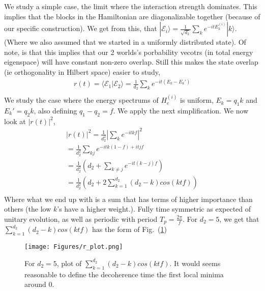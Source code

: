 \documentclass{article}
\begin{document}
We study a simple case, the limit where the interaction strength dominates. This implies that the blocks in the Hamiltonian are diagonalizable together (because of our specific construction). We get from this, that $|\mathcal{E}_i\rangle=\frac{1}{\sqrt{d_2}}\sum_ke^{-itE^{(i)}_k}|k\rangle$. (Where we also assumed that we started in a uniformly distributed state). Of note, is that this implies that our 2 worlds's porbability vecotrs (in total energy eigenspace) will have constant non-zero overlap. Still this makes the state overlap (ie orthogonality in Hilbert space) easier to study,
\begin{align}
    r(t)=\langle\mathcal{E}_1|\mathcal{E}_2\rangle = \frac{1}{d_2}\sum_ke^{-it(E_k-E_k')}\\
\end{align}
We study the case where the energy spectrums of $H_e^{(i)}$ is uniform, $E_k=q_1k$ and $E_k'=q_2k$, also defining $q_1-q_2=f$. We apply the next simplification. We now look at $|r(t)|^2$,
\begin{align}
    |r(t)|^2=\frac{1}{d_2^2}|\sum_ke^{-itkf}|^2\\
    =\frac{1}{d_2^2}\sum_{kj}e^{-itk(1-f)+itjf}\\
    =\frac{1}{d_2^2}(d_2+\sum_{k\neq j}e^{-it(k-j)f})\\
    =\frac{1}{d_2^2}(d_2+2\sum^{d_2}_{k=1}(d_2-k)cos(ktf))\\
\end{align}
Where what we end up with is a sum that has terms of higher importance than others (the low $k$'s have a higher weight.). Fully time symmetric as expected of unitary evolution, as well as periodic with period $T_p=\frac{2\pi}{f}$.  
For $d_2=5$, we get that $\sum^{d_2}_{k=1}(d_2-k)cos(ktf)$ has the form of Fig.~(\ref{fig:r_plot})
\begin{figure}
    \centering
    \texttt{[image: Figures/r\_plot.png]}
    \caption{For $d_2=5$, plot of  $\sum^{d_2}_{k=1}(d_2-k)cos(ktf)$. It would seems reasonable to define the decoherence time the first local minima around 0.}
    \label{fig:r_plot}
\end{figure}
\end{document}

